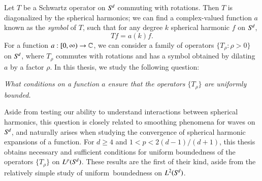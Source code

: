 
\vspace{-1em}
Let $T$ be a Schwartz operator on ${S}^{\!{d}}$ commuting with rotations. Then $T$ is diagonalized by the spherical harmonics; we can find a complex-valued function $a$ known as the \emph{symbol} of $T$, such that for any degree $k$ spherical harmonic $f$ on ${S}^{\!{d}}$,
%
\[ Tf = a(k) f. \]
%
For a function $a: [0,\infty) \to \operatorname{\mathbb{C}}$, we can consider a family of operators $\{ T_{\!\rho} : \rho > 0 \}$ on ${S}^{\!{d}}$, where $T_{\!\rho}$ commutes with rotations and has a symbol obtained by dilating $a$ by a factor $\rho$. In this thesis, we study the following question:  
%
\begin{changemargin}{3cm}{3cm}
\begin{center}
  \emph{What conditions on a function $a$ ensure that the operators $\{ T_{\!\rho} \}$ are uniformly bounded.}
\end{center}
\end{changemargin}
%
Aside from testing our ability to understand interactions between spherical harmonics, this question is closely related to smoothing phenomena for waves on ${S}^{\!{d}}$, and naturally arises when studying the convergence of spherical harmonic expansions of a function. For $d \geq 4$ and $1 < p < 2(d-1)/(d+1)$, this thesis obtains necessary and sufficient conditions for uniform boundedness of the operators $\{ T_{\!\rho} \}$ on $L^p({S}^{\!{d}})$. These results are the first of their kind, aside from the relatively simple study of uniform\ boundedness on $L^2({S}^{\!{d}})$.


%


